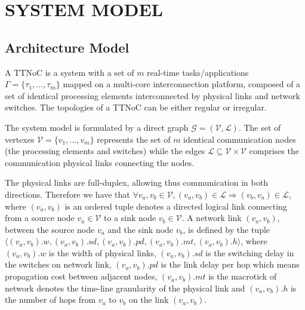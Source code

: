 \documentclass[conference]{IEEEtran}
\begin{document}

\section{SYSTEM MODEL}

\subsection{Architecture Model}

A TTNoC is a system with a set of $\mathit{m}$ real-time
tasks/applications $ \Gamma = \{\tau_{1},\dots,\tau_{m} \}$ mapped on
a multi-core interconnection platform, composed of a set of identical
processing elements interconnected by physical links and network
switches. The topologies of a TTNoC can be either regular or
irregular.

The system model is formulated by a direct graph $\mathcal{G}=(\mathcal{V},\mathcal{L})$. The set of vertexes $\mathcal{V}=\{ v_{1},\dots,v_{m}\}$ represents the set of $\mathit{m}$ identical communication nodes (the processing elements and switches) while the edges $\mathcal{L}\subseteq \mathcal{V} \times \mathcal{V}$ comprises the communication physical links connecting the nodes. 

The physical links are full-duplex, allowing thus communication in both directions. Therefore we have that $\forall v_{a},v_{b}\in\mathcal{V}, (v_{a},v_{b}) \in \mathcal{L} \Rightarrow (v_{b},v_{a})\in \mathcal{L}$, where $(v_{a},v_{b})$ is an ordered tuple denotes a directed logical link connecting from a source node $v_{a}\in \mathcal{V}$ to a sink node $v_{b}\in \mathcal{V}$. A network link $(v_{a},v_{b})$, between the source node $v_{a}$ and the sink node $v_{b}$, is defined by the tuple $\langle (v_{a},v_{b}).w, (v_{a},v_{b}).sd,(v_{a},v_{b}).pd,(v_{a},v_{b}).mt, (v_{a},v_{b}).h\rangle$, where $(v_{a},v_{b}).w$ is the width of physical links, $(v_{a},v_{b}).sd$ is the switching delay in the switches on network link, $(v_{a},v_{b}).pd$ is the link delay per hop which means propagation cost between adjacent nodes, $(v_{a},v_{b}).mt$ is the macrotick of network denotes the time-line granularity of the physical link and $(v_{a},v_{b}).h$ is the number of hops from $v_{a}$ to $v_{b}$ on the link $(v_{a},v_{b})$.
\end{document}
